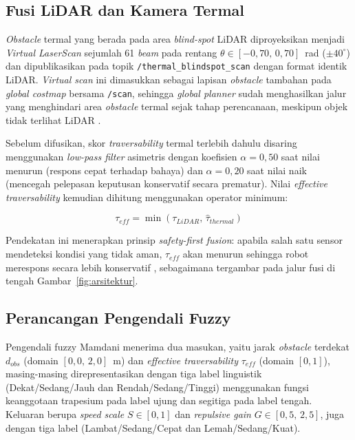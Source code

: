 \documentclass[10pt,twocolumn]{article}
\begin{document}
\subsection{Fusi LiDAR dan Kamera Termal}
\label{sec:fusi}

\textit{Obstacle} termal yang berada pada area \textit{blind-spot} LiDAR diproyeksikan menjadi \textit{Virtual LaserScan} sejumlah 61 \textit{beam} pada rentang $\theta\in[-0{,}70,\,0{,}70]$~rad ($\pm 40^\circ$) dan dipublikasikan pada topik \texttt{/thermal\_blindspot\_scan} dengan format identik LiDAR. \textit{Virtual scan} ini dimasukkan sebagai lapisan \textit{obstacle} tambahan pada \textit{global costmap} bersama \texttt{/scan}, sehingga \textit{global planner} sudah menghasilkan jalur yang menghindari area \textit{obstacle} termal sejak tahap perencanaan, meskipun objek tidak terlihat LiDAR \cite{Fagundes2024}.

Sebelum difusikan, skor \textit{traversability} termal terlebih dahulu disaring menggunakan \textit{low-pass filter} asimetris dengan koefisien $\alpha=0{,}50$ saat nilai menurun (respons cepat terhadap bahaya) dan $\alpha=0{,}20$ saat nilai naik (mencegah pelepasan keputusan konservatif secara prematur). Nilai \textit{effective traversability} kemudian dihitung menggunakan operator minimum:

\begin{equation}
\tau_{eff}=\min\!\left(\tau_{LiDAR},\,\hat{\tau}_{thermal}\right)
\label{eq:trav_eff}
\end{equation}

Pendekatan ini menerapkan prinsip \textit{safety-first fusion}: apabila salah satu sensor mendeteksi kondisi yang tidak aman, $\tau_{eff}$ akan menurun sehingga robot merespons secara lebih konservatif \cite{Haider2022,Schichler2025}, sebagaimana tergambar pada jalur fusi di tengah Gambar~\ref{fig:arsitektur}.

\subsection{Perancangan Pengendali Fuzzy}

Pengendali fuzzy Mamdani \cite{Mamdani1974} menerima dua masukan, yaitu jarak \textit{obstacle} terdekat $d_{obs}$ (domain $[0{,}0,\,2{,}0]$~m) dan \textit{effective traversability} $\tau_{eff}$ (domain $[0,1]$), masing-masing direpresentasikan dengan tiga label linguistik (Dekat/Sedang/Jauh dan Rendah/Sedang/Tinggi) menggunakan fungsi keanggotaan trapesium pada label ujung dan segitiga pada label tengah. Keluaran berupa \textit{speed scale} $S\in[0,1]$ dan \textit{repulsive gain} $G\in[0{,}5,\,2{,}5]$, juga dengan tiga label (Lambat/Sedang/Cepat dan Lemah/Sedang/Kuat).
\end{document}
